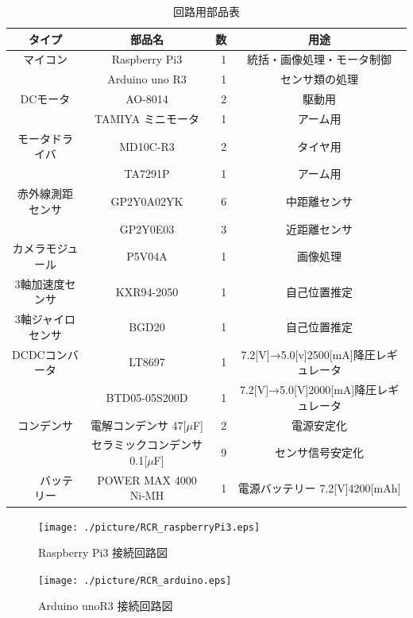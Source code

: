 \documentclass[10pt,a4j]{jarticle}
\begin{document}
\begin{table}[hb]
  \centering
  \caption{回路用部品表}
  \begin{tabular}{|c|c|r||c|} \hline
    タイプ & 部品名 & 数 & 用途 \\ \hline \hline
     マイコン & Raspberry Pi3 & 1& 統括・画像処理・モータ制御 \\ \cline{2-4}
   　　& Arduino uno R3& 1 & センサ類の処理 \\ \hline
     DCモータ & AO-8014 & 2 & 駆動用 \\ \cline{2-4}
      & TAMIYA ミニモータ & 1&アーム用  \\ \hline
    モータドライバ& MD10C-R3 & 2& タイヤ用 \\ \cline{2-4}
      &  TA7291P&1 &アーム用 \\ \hline
     赤外線測距センサ& GP2Y0A02YK &6&中距離センサ\\ \cline{2-4}
       &GP2Y0E03&3&近距離センサ \\ \hline
     カメラモジュール&P5V04A&1&画像処理\\ \hline
     3軸加速度センサ&KXR94-2050&1&自己位置推定\\ \hline
     3軸ジャイロセンサ&BGD20&1&自己位置推定\\ \hline
    DCDCコンバータ&LT8697&1& 7.2[V]→5.0[v]2500[mA]降圧レギュレータ\\ \cline{2-4}
       &BTD05-05S200D&1&7.2[V]→5.0[V]2000[mA]降圧レギュレータ\\ \hline
    コンデンサ&電解コンデンサ 47[$\mu$F]&2&電源安定化\\ \cline{2-4}
            &セラミックコンデンサ 0.1[$\mu$F]&9&センサ信号安定化\\ \hline
　　バッテリー&POWER MAX 4000 Ni-MH&1&電源バッテリー 7.2[V]4200[mAh]\\ \hline
                 
  \end{tabular}
  \label{tab:c_parts}
\end{table}

\newpage
\begin{figure}[H]
 \centering
 \texttt{[image: ./picture/RCR\_raspberryPi3.eps]}
    \caption{Raspberry Pi3 接続回路図}
    \label{c_raspberry}
\end{figure}
\begin{figure}[H]
 \centering
 \texttt{[image: ./picture/RCR\_arduino.eps]}
    \caption{Arduino unoR3 接続回路図}
    \label{c_arduino}
\end{figure}
\end{document}
